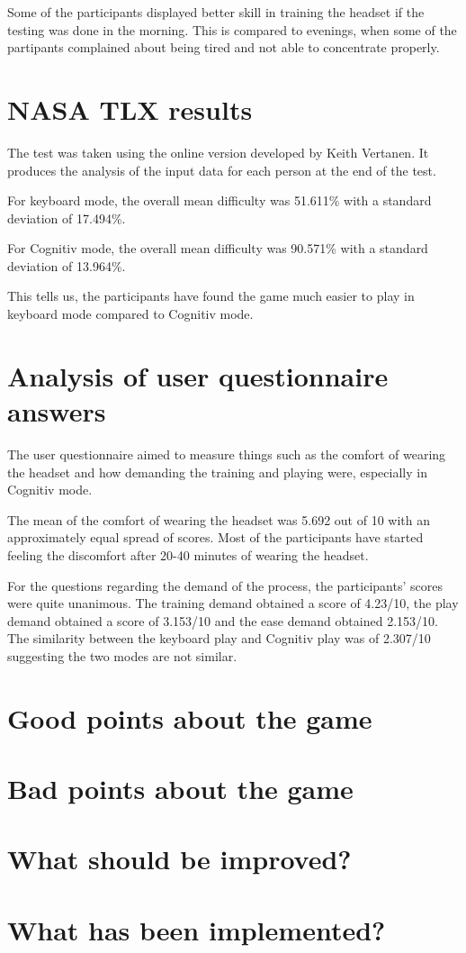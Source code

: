 Some of the participants displayed better skill in training the headset if the testing was done in the morning. This is compared to evenings, when some of the partipants complained about being tired and not able to concentrate properly.

\section{NASA TLX results}
The test was taken using the \cite{nasatlx} online version developed by Keith Vertanen. It produces the analysis of the input data for each person at the end of the test. 

For keyboard mode, the overall mean difficulty was 51.611\% with a standard deviation of 17.494\%.

For Cognitiv mode, the overall mean difficulty was 90.571\% with a standard deviation of 13.964\%.

This tells us, the participants have found the game much easier to play in keyboard mode compared to Cognitiv mode.

\section{Analysis of user questionnaire answers}
The user questionnaire aimed to measure things such as the comfort of wearing the headset and how demanding the training and playing were, especially in Cognitiv mode.

The mean of the comfort of wearing the headset was 5.692 out of 10 with an approximately equal spread of scores. Most of the participants have started feeling the discomfort after 20-40 minutes of wearing the headset. 

For the questions regarding the demand of the process, the participants' scores were quite unanimous. The training demand obtained a score of 4.23/10, the play demand obtained a score of 3.153/10 and the ease demand obtained 2.153/10. The similarity between the keyboard play and Cognitiv play was of 2.307/10 suggesting the two modes are not similar.

\section{Good points about the game}

\section{Bad points about the game}

\section{What should be improved?}

\section{What has been implemented?}
\label{section:implemented}

